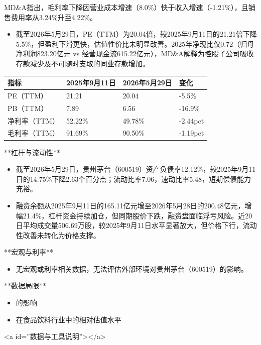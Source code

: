 \documentclass[12pt,a4paper]{article}
\begin{document}
MD\&A指出，毛利率下降因营业成本增速（8.0\%）快于收入增速（-1.21\%），且销售费用率从3.24\%升至4.22\%。
\begin{itemize}
\item 截至2026年5月29日，PE（TTM）为20.04倍，较2025年9月11日的21.21倍下降5.5\%，但盈利下滑更快，估值性价比未明显改善。2025年净现比仅0.72（归母净利润823.20亿元 vs 经营现金流615.22亿元），MD\&A解释为控股子公司吸收存款减少及不可随时支取的同业存款增加。
\end{itemize}

\begin{table}[htbp]
\centering
\begin{tabular}{llll}
\toprule
指标 & 2025年9月11日 & 2026年5月29日 & 变化 \\
\midrule
PE（TTM） & 21.21 & 20.04 & -5.5\% \\
PB（TTM） & 7.89 & 6.56 & -16.9\% \\
净利率（TTM） & 52.22\% & 49.78\% & -2.44pct \\
毛利率（TTM） & 91.69\% & 90.50\% & -1.19pct \\
\bottomrule
\end{tabular}
\end{table}


**杠杆与流动性**
\begin{itemize}
\item 截至2026年5月29日，贵州茅台（600519）资产负债率12.12\%，较2025年9月11日的14.75\%下降2.63个百分点；流动比率7.06，速动比率5.48，短期偿债能力充裕。
\item 融资余额从2025年9月11日的165.11亿元增至2026年5月28日的200.48亿元，增幅21.4\%，杠杆资金持续加仓，但同期股价下跌，融资盘面临浮亏风险。近20日平均成交量506.69万股，较2025年9月11日水平显著放大，但价格下行，流动性改善未转化为价格支撑。
\end{itemize}

**宏观与利率**
\begin{itemize}
\item 无宏观或利率相关数据，无法评估外部环境对贵州茅台（600519）的影响。
\end{itemize}

**数据局限**

\begin{itemize}
\item 的影响
\item 在食品饮料行业中的相对估值水平
\end{itemize}

<a id=''数据与工具说明''></a>
\end{document}
